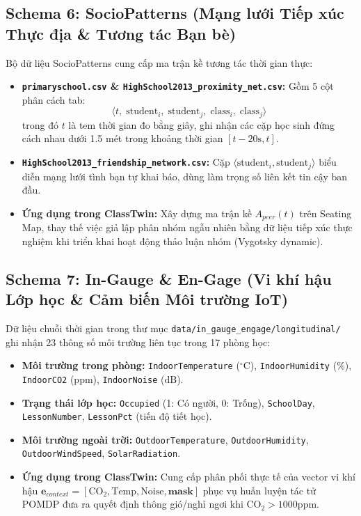 \subsection{Schema 6: SocioPatterns (Mạng lưới Tiếp xúc Thực địa \& Tương tác Bạn bè)}\label{subsec:schema-sociopatterns}
Bộ dữ liệu SocioPatterns cung cấp ma trận kề tương tác thời gian thực:
\begin{itemize}
  \item \textbf{\texttt{primaryschool.csv} \& \texttt{HighSchool2013\_proximity\_net.csv}:} Gồm 5 cột phân cách tab:
  \begin{equation}
    \langle t, \; \text{student}_i, \; \text{student}_j, \; \text{class}_i, \; \text{class}_j \rangle
  \end{equation}
  trong đó $t$ là tem thời gian đo bằng giây, ghi nhận các cặp học sinh đứng cách nhau dưới 1.5 mét trong khoảng thời gian $[t - 20\text{s}, t]$.
  \item \textbf{\texttt{HighSchool2013\_friendship\_network.csv}:} Cặp $\langle \text{student}_i, \text{student}_j \rangle$ biểu diễn mạng lưới tình bạn tự khai báo, dùng làm trọng số liên kết tin cậy ban đầu.
  \item \textbf{Ứng dụng trong ClassTwin:} Xây dựng ma trận kề $A_{peer}(t)$ trên Seating Map, thay thế việc giả lập phân nhóm ngẫu nhiên bằng dữ liệu tiếp xúc thực nghiệm khi triển khai hoạt động thảo luận nhóm (Vygotsky dynamic).
\end{itemize}

\subsection{Schema 7: In-Gauge \& En-Gage (Vi khí hậu Lớp học \& Cảm biến Môi trường IoT)}\label{subsec:schema-in-gauge}
Dữ liệu chuỗi thời gian trong thư mục \texttt{data/in\_gauge\_engage/longitudinal/} ghi nhận 23 thông số môi trường liên tục trong 17 phòng học:
\begin{itemize}
  \item \textbf{Môi trường trong phòng:} \texttt{IndoorTemperature} ($^\circ\text{C}$), \texttt{IndoorHumidity} (\%), \texttt{IndoorCO2} (ppm), \texttt{IndoorNoise} ($\text{dB}$).
  \item \textbf{Trạng thái lớp học:} \texttt{Occupied} (1: Có người, 0: Trống), \texttt{SchoolDay}, \texttt{LessonNumber}, \texttt{LessonPct} (tiến độ tiết học).
  \item \textbf{Môi trường ngoài trời:} \texttt{OutdoorTemperature}, \texttt{OutdoorHumidity}, \texttt{OutdoorWindSpeed}, \texttt{SolarRadiation}.
  \item \textbf{Ứng dụng trong ClassTwin:} Cung cấp phân phối thực tế của vector vi khí hậu $\mathbf{e}_{context} = [\text{CO}_2, \text{Temp}, \text{Noise}, \mathbf{mask}]$ phục vụ huấn luyện tác tử POMDP đưa ra quyết định thông gió/nghỉ ngơi khi $\text{CO}_2 > 1000\text{ppm}$.
\end{itemize}

